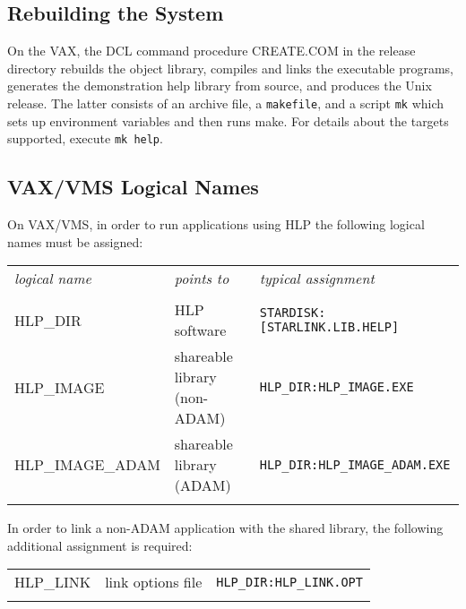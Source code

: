 \subsection{Rebuilding the System}
On the VAX, the DCL command procedure CREATE.COM in the release
directory rebuilds the object
library, compiles and links the executable programs, generates
the demonstration help library from source, and produces the
Unix release.  The latter consists of an archive file, a {\tt makefile},
and a script {\tt mk} which sets up environment variables and
then runs make.  For details about the targets supported, execute
{\tt mk help}.

\subsection{VAX/VMS Logical Names}
On VAX/VMS, in order to run applications using HLP the following
logical names must be assigned:

\begin{tabular}{lll}
\\
 {\it logical name} & {\it points to} & {\it typical assignment} \\ \\
 HLP\_DIR & HLP software & {\tt STARDISK:[STARLINK.LIB.HELP]} \\
 HLP\_IMAGE & shareable library (non-ADAM) &
                               {\tt HLP\_DIR:HLP\_IMAGE.EXE} \\
 HLP\_IMAGE\_ADAM & shareable library (ADAM) &
                                 {\tt HLP\_DIR:HLP\_IMAGE\_ADAM.EXE} \\ \\
\end{tabular}

In order to link a non-ADAM application with the shared library, the
following additional assignment is required:

\begin{tabular}{lll}
\\
 HLP\_LINK & link options file & {\tt HLP\_DIR:HLP\_LINK.OPT} \\ \\
\end{tabular}

